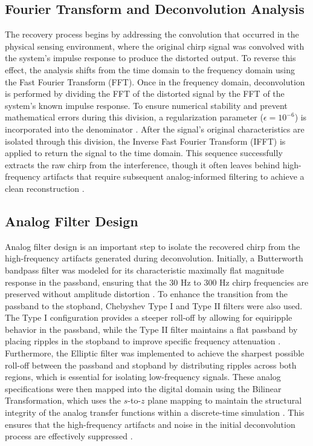 \subsection{Fourier Transform and Deconvolution Analysis}

The recovery process begins by addressing the convolution that occurred in the physical sensing environment, where the original chirp signal was convolved with the system's impulse response to produce the distorted output. To reverse this effect, the analysis shifts from the time domain to the frequency domain using the Fast Fourier Transform (FFT). Once in the frequency domain, deconvolution is performed by dividing the FFT of the distorted signal by the FFT of the system’s known impulse response. To ensure numerical stability and prevent mathematical errors during this division, a regularization parameter ($\epsilon = 10^{-6}$) is incorporated into the denominator \cite{5}. After the signal’s original characteristics are isolated through this division, the Inverse Fast Fourier Transform (IFFT) is applied to return the signal to the time domain. This sequence successfully extracts the raw chirp from the interference, though it often leaves behind high-frequency artifacts that require subsequent analog-informed filtering to achieve a clean reconstruction \cite{4}.

\subsection{Analog Filter Design}

Analog filter design is an important step to isolate the recovered chirp from the high-frequency artifacts generated during deconvolution. Initially, a Butterworth bandpass filter was modeled for its characteristic maximally flat magnitude response in the passband, ensuring that the 30 Hz to 300 Hz chirp frequencies are preserved without amplitude distortion \cite{4}. To enhance the transition from the passband to the stopband, Chebyshev Type I and Type II filters were also used. The Type I configuration provides a steeper roll-off by allowing for equiripple behavior in the passband, while the Type II filter maintains a flat passband by placing ripples in the stopband to improve specific frequency attenuation \cite{5}. Furthermore, the Elliptic filter was implemented to achieve the sharpest possible roll-off between the passband and stopband by distributing ripples across both regions, which is essential for isolating low-frequency signals. These analog specifications were then mapped into the digital domain using the Bilinear Transformation, which uses the $s$-to-$z$ plane mapping to maintain the structural integrity of the analog transfer functions within a discrete-time simulation \cite{4, 5}. This ensures that the high-frequency artifacts and noise in the initial deconvolution process are effectively suppressed \cite{4}.

